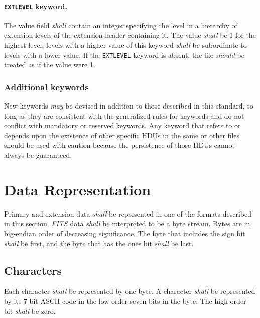 \documentclass[onecolumn]{aa}
\begin{document}
   \paragraph{{\tt EXTLEVEL} keyword.}
 The value field {\em shall} contain an integer specifying the
 level in a hierarchy of extension levels of the extension
 header containing it.  The value {\em shall} be 1 for the highest
 level; levels with a higher value of this keyword {\em shall} be
 subordinate to levels with a lower value. If the {\tt EXTLEVEL}
 keyword is absent, the file {\em should} be treated as if the
 value were 1.
  
   \subsubsection{Additional keywords}
  
   New keywords
   {\em may} be devised in addition to those
   described in this standard, so long as they are consistent
   with the generalized rules for keywords and do not conflict
   with mandatory or reserved keywords.
   Any keyword that refers to or depends upon the existence of other
   specific HDUs in the same or other files should
   be used with caution because the persistence of those HDUs cannot always
   be guaranteed.


  \section{Data Representation}
   \label{s:Drep}
  Primary and extension data {\em shall} be 
  represented in one of the formats
  described in this section.  {\em FITS\/} data {\em shall} be interpreted to 
  be a byte stream.  Bytes are in big-endian 
  order
  of decreasing significance.
  The byte that includes the sign bit
  {\em shall} be first, and the byte 
  that has the ones bit {\em shall} be last.   
  
  \subsection{Characters}
   Each character {\em shall} be represented by 
   one byte.  A character
   {\em shall} be represented by its 7-bit ASCII \citep{ansi77} code in the low order 
   seven bits in the byte.  The high-order bit {\em shall} be zero.
  
\end{document}
